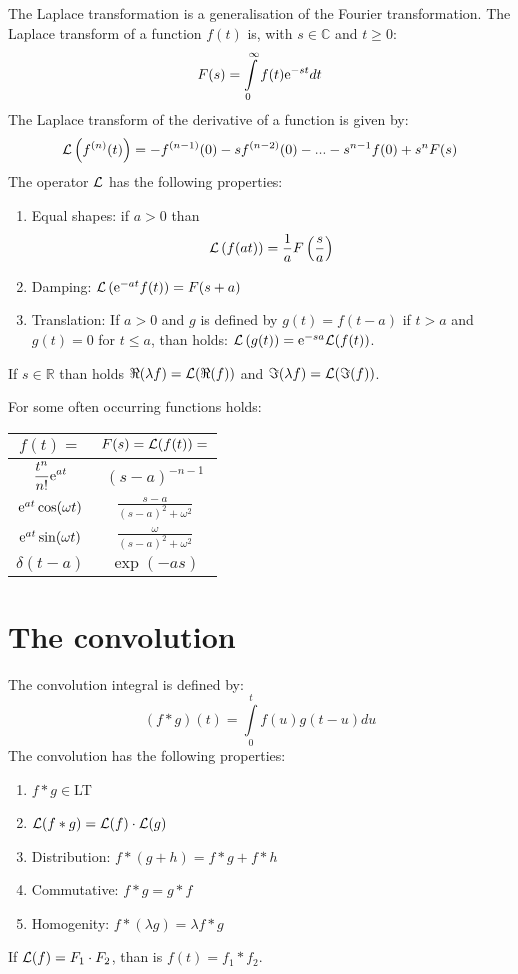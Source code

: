 The Laplace transformation is a generalisation of the Fourier transformation.
The Laplace transform of a function $f(t)$ is, with $s\in\mathbb{C}$ and $t\geq0$:
\[
F(s)=\int\limits_0^\infty f(t){\rm e}^{-st}dt
\]
The Laplace transform of the derivative of a function is given by:
\[
{\cal L}\left(f^{(n)}(t)\right)=-f^{(n-1)}(0)-sf^{(n-2)}(0)-...-s^{n-1}f(0)+s^nF(s)
\]
The operator $\cal L$ has the following properties:
\begin{enumerate}
	\item Equal shapes: if $a>0$ than
	\[
	{\cal L}\left(f(at)\right)=\frac{1}{a}F\left(\frac{s}{a}\right)
	\]
	\item Damping: ${\cal L}\left({\rm e}^{-at}f(t)\right)=F(s+a)$
	\item Translation: If $a>0$ and $g$ is defined by $g(t)=f(t-a)$ if
	$t>a$ and $g(t)=0$ for $t\leq a$, than holds:
	${\cal L}\left(g(t)\right)={\rm e}^{-sa}{\cal L}(f(t))$.
\end{enumerate}
If $s\in \mathbb{R}$ than holds $\Re(\lambda f)={\cal L}(\Re(f))$ and
$\Im(\lambda f)={\cal L}(\Im(f))$.
 
For some often occurring functions holds:
\begin{center}
	\begin{tabular}{||c||c||}
		\hline
		$f(t)=$&$F(s)={\cal L}(f(t))=$\\
		\hline
		\hline
		$\displaystyle\frac{t^n}{n!}{\rm e}^{at}$&$(s-a)^{-n-1}$\rule{0pt}{15pt}\\
		${\rm e}^{at}\cos(\omega t)$&$\displaystyle\frac{s-a}{(s-a)^2+\omega^2}$\rule{0pt}{15pt}\\
		${\rm e}^{at}\sin(\omega t)$&$\displaystyle\frac{\omega}{(s-a)^2+\omega^2}$\rule{0pt}{15pt}\\
		$\delta(t-a)$&$\exp(-as)$\rule{0pt}{13pt}\\
		\hline
	\end{tabular}
\end{center}

\section{The convolution}
The convolution integral is defined by:
\[
(f*g)(t)=\int\limits_0^tf(u)g(t-u)du
\]
The convolution has the following properties:
\begin{enumerate}
	\item $f*g\in$LT
	\item ${\cal L}(f*g)={\cal L}(f)\cdot{\cal L}(g)$
	\item Distribution: $f*(g+h)=f*g+f*h$
	\item Commutative: $f*g=g*f$
	\item Homogenity: $f*(\lambda g)=\lambda f*g$
\end{enumerate}
If ${\cal L}(f)=F_1\cdot F_2$, than is $f(t)=f_1*f_2$.

